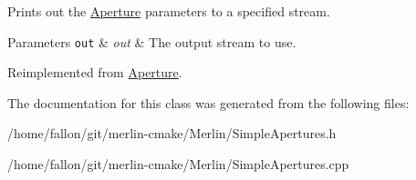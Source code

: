 Prints out the \hyperlink{classAperture}{Aperture} parameters to a specified stream. 
\begin{DoxyParams}[1]{Parameters}
\mbox{\tt out}  & {\em out} & The output stream to use. \\
\hline
\end{DoxyParams}


Reimplemented from \hyperlink{classAperture_aff2f276b93bb2cb94e559e1c4901e38e}{Aperture}.



The documentation for this class was generated from the following files\+:\begin{DoxyCompactItemize}
\item 
/home/fallon/git/merlin-\/cmake/\+Merlin/Simple\+Apertures.\+h\item 
/home/fallon/git/merlin-\/cmake/\+Merlin/Simple\+Apertures.\+cpp\end{DoxyCompactItemize}
